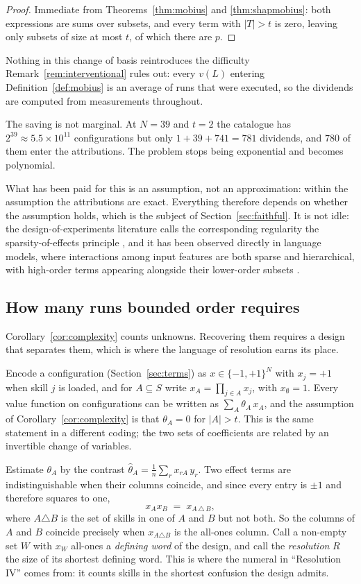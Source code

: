 \documentclass[11pt]{article}
\theoremstyle{plain}
\theoremstyle{definition}
\theoremstyle{remark}
\begin{document}
\begin{proof}
Immediate from Theorems~\ref{thm:mobius} and \ref{thm:shapmobius}: both expressions are sums over subsets, and every term with $|T| > t$ is zero, leaving only subsets of size at most $t$, of which there are $p$.
\end{proof}

Nothing in this change of basis reintroduces the difficulty Remark~\ref{rem:interventional} rules out: every $v(L)$ entering Definition~\ref{def:mobius} is an average of runs that were executed, so the dividends are computed from measurements throughout.

The saving is not marginal. At $N = 39$ and $t = 2$ the catalogue has $2^{39} \approx 5.5 \times 10^{11}$ configurations but only $1 + 39 + 741 = 781$ dividends, and $780$ of them enter the attributions. The problem stops being exponential and becomes polynomial.

What has been paid for this is an assumption, not an approximation: within the assumption the attributions are exact. Everything therefore depends on whether the assumption holds, which is the subject of Section~\ref{sec:faithful}. It is not idle: the design-of-experiments literature calls the corresponding regularity the sparsity-of-effects principle \cite{bhh}, and it has been observed directly in language models, where interactions among input features are both sparse and hierarchical, with high-order terms appearing alongside their lower-order subsets \cite{spex,proxyspex}.

\subsection{How many runs bounded order requires}

Corollary~\ref{cor:complexity} counts unknowns. Recovering them requires a design that separates them, which is where the language of resolution earns its place.

Encode a configuration (Section~\ref{sec:terms}) as $x \in \{-1,+1\}^N$ with $x_j = +1$ when skill $j$ is loaded, and for $A \subseteq S$ write $x_A = \prod_{j \in A} x_j$, with $x_\emptyset = 1$. Every value function on configurations can be written as $\sum_{A} \theta_A\, x_A$, and the assumption of Corollary~\ref{cor:complexity} is that $\theta_A = 0$ for $|A| > t$. This is the same statement in a different coding; the two sets of coefficients are related by an invertible change of variables.

Estimate $\theta_A$ by the contrast $\hat\theta_A = \frac{1}{n}\sum_{r} x_{rA}\, y_r$. Two effect terms are indistinguishable when their columns coincide, and since every entry is $\pm 1$ and therefore squares to one,
\[
x_A x_B \;=\; x_{A \,\triangle\, B},
\]
where $A \triangle B$ is the set of skills in one of $A$ and $B$ but not both. So the columns of $A$ and $B$ coincide precisely when $x_{A \triangle B}$ is the all-ones column. Call a non-empty set $W$ with $x_W$ all-ones a \emph{defining word} of the design, and call the \emph{resolution} $R$ the size of its shortest defining word. This is where the numeral in ``Resolution IV'' comes from: it counts skills in the shortest confusion the design admits.
\end{document}
